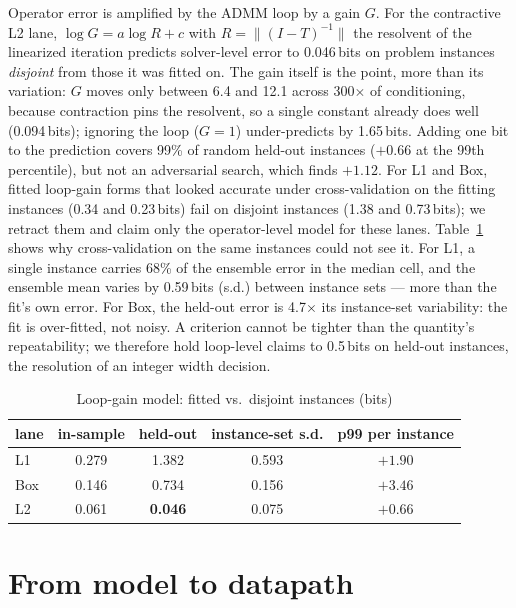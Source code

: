 \documentclass[conference]{IEEEtran}
\begin{document}
Operator error is amplified by the ADMM loop by a gain $G$. For the
contractive L2 lane, $\log G=a\log R+c$ with $R=\lVert(I-T)^{-1}\rVert$ the
resolvent of the linearized iteration predicts solver-level error to 0.046\,bits
on problem instances \emph{disjoint} from those it was fitted on. The gain
itself is the point, more than its variation: $G$ moves only between 6.4 and
12.1 across 300$\times$ of conditioning, because contraction pins the resolvent,
so a single constant already does well (0.094\,bits); ignoring the loop
($G=1$) under-predicts by 1.65\,bits. Adding one bit to the prediction covers
99\% of random held-out instances ($+0.66$ at the 99th percentile), but not an
adversarial search, which finds $+1.12$.
For L1 and Box, fitted loop-gain forms that looked accurate under
cross-validation on the fitting instances (0.34 and 0.23\,bits) fail on
disjoint instances (1.38 and 0.73\,bits); we retract them and claim only the
operator-level model for these lanes. Table~\ref{tab:heldout} shows why
cross-validation on the same instances could not see it. For L1, a single
instance carries 68\% of the ensemble error in the median cell, and the
ensemble mean varies by 0.59\,bits (s.d.) between instance sets --- more than
the fit's own error. For Box, the held-out error is 4.7$\times$ its
instance-set variability: the fit is over-fitted, not noisy. A criterion cannot be
tighter than the quantity's repeatability; we therefore hold loop-level claims
to 0.5\,bits on held-out instances, the resolution of an integer width
decision.

\begin{table}[t]
\centering\footnotesize\setlength{\tabcolsep}{4pt}
\caption{Loop-gain model: fitted vs.\ disjoint instances (bits)}
\label{tab:heldout}
\begin{tabular}{lcccc}
\toprule
lane & in-sample & held-out & instance-set s.d. & p99 per instance \\
\midrule
L1  & 0.279 & 1.382 & 0.593 & $+1.90$ \\
Box & 0.146 & 0.734 & 0.156 & $+3.46$ \\
L2  & 0.061 & \textbf{0.046} & 0.075 & $+0.66$ \\
\bottomrule
\end{tabular}
\end{table}

\section{From model to datapath}
\label{sec:width}
\end{document}

